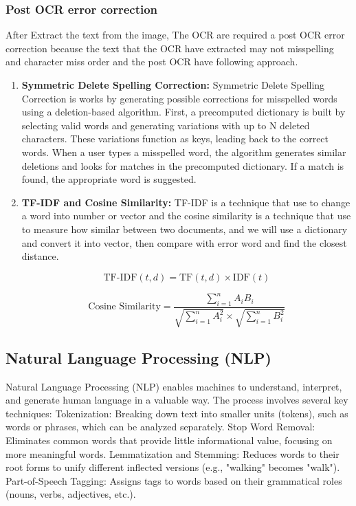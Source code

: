 \documentclass[12pt,oneside,openright,a4paper]{cpe-english-project}
\begin{document}
\subsubsection{Post OCR error correction} After Extract the text from the image, The OCR are required a post OCR error correction because the text that the OCR have extracted may not misspelling and character miss order and the post OCR have following approach.

\begin{enumerate}
	\item \textbf{Symmetric Delete Spelling Correction:} Symmetric Delete Spelling Correction is works by generating possible corrections for misspelled words using a deletion-based algorithm. First, a precomputed dictionary is built by selecting valid words and generating variations with up to N deleted characters. These variations function as keys, leading back to the correct words. When a user types a misspelled word, the algorithm generates similar deletions and looks for matches in the precomputed dictionary. If a match is found, the appropriate word is suggested.
\newpage %
	\item \textbf{TF-IDF and Cosine Similarity:} TF-IDF is a technique that use to change a word into number or vector and the cosine similarity is a technique that use to measure how similar between two documents, and we will use a dictionary and convert it into vector, then compare with error word and find the closest distance.
	
\[
\text{TF-IDF}(t, d) = \text{TF}(t, d) \times \text{IDF}(t)
\]
	
\[
\text{Cosine Similarity} = \frac{\sum_{i=1}^{n} A_i B_i}{\sqrt{\sum_{i=1}^{n} A_i^2} \times \sqrt{\sum_{i=1}^{n} B_i^2}}
\]

\end{enumerate}

\subsection{Natural Language Processing (NLP)} Natural Language Processing (NLP) enables machines to understand, interpret, and generate human language in a valuable way. The process involves several key techniques: Tokenization: Breaking down text into smaller units (tokens), such as words or phrases, which can be analyzed separately. Stop Word Removal: Eliminates common words that provide little informational value, focusing on more meaningful words. Lemmatization and Stemming: Reduces words to their root forms to unify different inflected versions (e.g., "walking" becomes "walk"). Part-of-Speech Tagging: Assigns tags to words based on their grammatical roles (nouns, verbs, adjectives, etc.).
\end{document}

